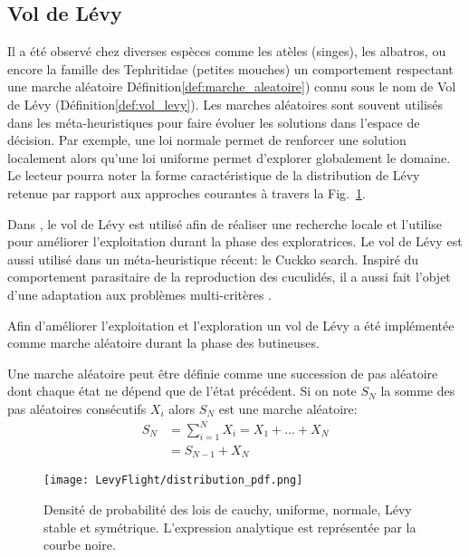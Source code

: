 \subsection{Vol de Lévy} %
\label{sub:vol_de_levy}
Il a été observé chez diverses espèces comme les atèles (singes), les albatros, ou encore la famille des
Tephritidae (petites mouches) un comportement respectant une marche aléatoire
Définition\ref{def:marche_aleatoire}) connu sous le nom de Vol de Lévy (Définition\ref{def:vol_levy}).
Les marches aléatoires sont souvent utilisés dans les méta-heuristiques pour faire
évoluer les solutions dans l’espace de décision. Par exemple, une loi normale permet
de renforcer une solution localement alors qu’une loi uniforme permet d’explorer
globalement le domaine. Le lecteur pourra noter la forme caractéristique de la
distribution de Lévy retenue par rapport aux approches courantes à travers
la Fig.~\ref{fig:distribution_pdf}.

Dans \cite{Sharma2012213}, le vol de Lévy est utilisé afin de réaliser une recherche locale
et \cite{Hakli2013254} l’utilise pour améliorer l’exploitation durant la phase des exploratrices.
Le vol de Lévy est aussi utilisé dans un méta-heuristique récent: le Cuckko search.
Inspiré du comportement parasitaire de la reproduction des cuculidés, il a aussi fait l’objet
d’une adaptation aux problèmes multi-critères \parencite{Yang20131616}.

Afin d’améliorer l’exploitation et l’exploration un vol de Lévy a été implémentée
comme marche aléatoire durant la phase des butineuses.

\begin{Def}\label{def:marche_aleatoire}
Une marche aléatoire \parencite{Yang201445} peut être définie comme une succession de pas
aléatoire dont chaque état ne dépend que de l’état précédent. Si on note $S_{N}$
la somme des pas aléatoires consécutifs $X_{i}$ alors $S_{N}$ est une marche aléatoire:
\begin{equation}\label{eq:marche_aleatoire}
    \begin{split}
        S_{N} &= \sum_{i=1}^{N} X_{i} = X_{1} + ... + X_{N}\\
              &= S_{N-1} + X_{N}
    \end{split}
\end{equation}
\end{Def}

\begin{figure}
    \begin{center}
        \texttt{[image: LevyFlight/distribution\_pdf.png]}
    \end{center}
    \caption{Densité de probabilité des lois de cauchy, uniforme, normale, Lévy stable et symétrique.
             L’expression analytique est représentée par la courbe noire.
             \label{fig:distribution_pdf}}
\end{figure}

